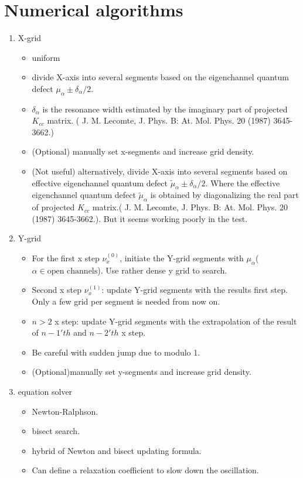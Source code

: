 \documentclass[11pt]{article}
\begin{document}
\section{\label{sec:numerical}Numerical algorithms}
\begin{enumerate}
\item X-grid
\begin{itemize}
	\item uniform 
	\item divide X-axis into several segments based on the eigenchannel quantum defect $\mu_{\alpha}\pm \delta_{\alpha}/2$.
	\item $\delta_{\alpha}$ is the resonance width estimated by the imaginary part of projected $K_{cc}$ matrix. ( J. M. Lecomte, J. Phys. B: At. Mol. Phys. 20 (1987) 3645-3662.) 
	\item (Optional) manually set x-segments and increase grid density.  
	\item (Not useful) alternatively, divide X-axis into several segments based on effective eigenchannel quantum defect  $\tilde{\mu}_{\alpha} \pm \delta_{\alpha}/2$. Where the effective eigenchannel quantum defect  $\tilde{\mu}_{\alpha}$ is obtained by diagonalizing the real part of projected $K_{cc}$ matrix.( J. M. Lecomte, J. Phys. B: At. Mol. Phys. 20 (1987) 3645-3662.). But it seems working poorly in the test.
\end{itemize}
\item Y-grid 
\begin{itemize}
	\item For the first x step $\nu_{x}^{(0)}$, initiate the Y-grid segments with $\mu_{\alpha}$($\alpha \in \text{open channels}$). Use rather dense y grid to search.
	\item Second x step $\nu_{x}^{(1)}$: update Y-grid segments with the results first step. Only a few grid per segment is needed from now on.
	\item $n>2$ x step: update Y-grid segments with the extrapolation of the result of $n-1'th$ and $n-2'th$ x step.
	\item Be careful with sudden jump due to modulo 1.
	\item (Optional)manually set y-segments and increase grid density.
\end{itemize}
\item equation solver
\begin{itemize}
	\item Newton-Ralphson.
	\item bisect search.
	\item hybrid of Newton and bisect updating formula.
	\item Can define a relaxation coefficient to slow down the oscillation.
\end{itemize}
\end{enumerate}
\end{document}
